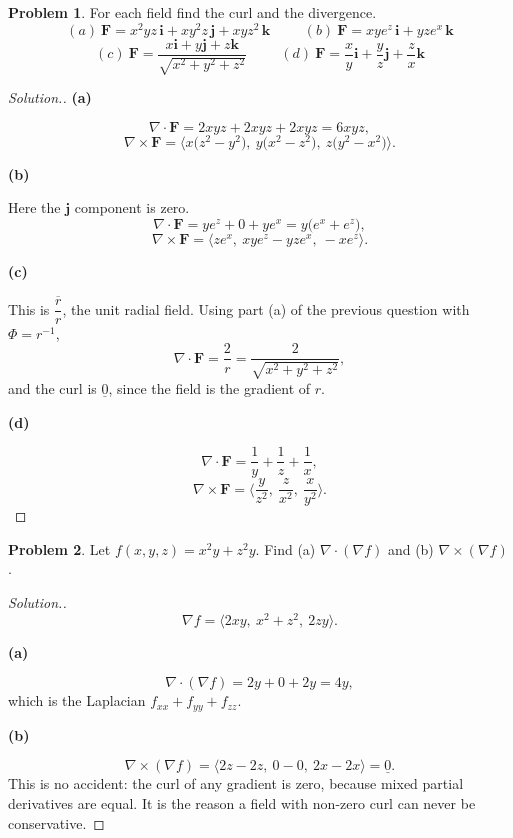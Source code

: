 \documentclass[11pt,a4paper]{article}
\theoremstyle{definition}
\newtheorem{problemx}{Problem}[subsection]
\newenvironment{problem}{\begin{problemx}}{\end{problemx}}
\newenvironment{solution}
  {\renewcommand{\qedsymbol}{}\begin{proof}[\textit{Solution}.]}
  {\end{proof}}
\newcommand{\subhead}[1]{%
  \par\medskip\noindent\textbf{#1}\par\nobreak\smallskip}
\begin{document}
\begin{problem}
For each field find the curl and the divergence.
$$(a)\ \textbf{F} = x^2yz\,\textbf{i} + xy^2z\,\textbf{j} + xyz^2\,\textbf{k}
\hspace{1cm}(b)\ \textbf{F} = xye^z\,\textbf{i} + yze^x\,\textbf{k}$$
$$(c)\ \textbf{F} = \frac{x\textbf{i}+y\textbf{j}+z\textbf{k}}
{\sqrt{x^2+y^2+z^2}}\hspace{1cm}
(d)\ \textbf{F} = \frac{x}{y}\textbf{i} + \frac{y}{z}\textbf{j}
+ \frac{z}{x}\textbf{k}$$
\end{problem}
\begin{solution}
\subhead{(a)}
$$\nabla\cdot\textbf{F} = 2xyz + 2xyz + 2xyz = 6xyz ,$$
$$\nabla\times\textbf{F}
= \big\langle x\big(z^2-y^2\big),\ y\big(x^2-z^2\big),\ z\big(y^2-x^2\big)
\big\rangle .$$

\subhead{(b)}
Here the $\textbf{j}$ component is zero.
$$\nabla\cdot\textbf{F} = ye^z + 0 + ye^x = y\big(e^x+e^z\big),$$
$$\nabla\times\textbf{F}
= \big\langle ze^x,\ xye^z - yze^x,\ -xe^z\big\rangle .$$

\subhead{(c)}
This is $\dfrac{\overline{r}}{r}$, the unit radial field. Using part (a) of the
previous question with $\Phi = r^{-1}$,
$$\nabla\cdot\textbf{F} = \frac2r = \frac{2}{\sqrt{x^2+y^2+z^2}},$$
and the curl is $\underline{0}$, since the field is the gradient of $r$.

\subhead{(d)}
$$\nabla\cdot\textbf{F} = \frac1y + \frac1z + \frac1x ,$$
$$\nabla\times\textbf{F}
= \Big\langle \frac{y}{z^2},\ \frac{z}{x^2},\ \frac{x}{y^2}\Big\rangle .$$
\end{solution}

\begin{problem}
Let $f(x,y,z) = x^2y+z^2y$. Find
(a) $\nabla\cdot(\nabla f)$ and (b) $\nabla\times(\nabla f)$.
\end{problem}
\begin{solution}
$$\nabla f = \big\langle 2xy,\ x^2+z^2,\ 2zy\big\rangle .$$

\subhead{(a)}
$$\nabla\cdot(\nabla f) = 2y + 0 + 2y = 4y ,$$
which is the Laplacian $f_{xx}+f_{yy}+f_{zz}$.

\subhead{(b)}
$$\nabla\times(\nabla f)
= \big\langle 2z-2z,\ 0-0,\ 2x-2x\big\rangle = \underline{0}.$$
This is no accident: the curl of any gradient is zero, because mixed partial
derivatives are equal. It is the reason a field with non-zero curl can never be
conservative.
\end{solution}
\end{document}
